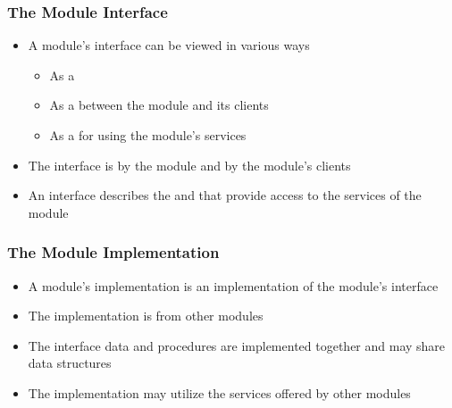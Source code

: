 \documentclass[t,12pt,numbers,fleqn]{beamer}
\begin{document}
\begin{frame}
\frametitle{The Module Interface}

\begin{itemize}

\item A module's interface can be viewed in various ways
\begin{itemize}
\item As a 
\item As a  between the module and its clients
\item As a  for using the module's services
\end{itemize}
\item The interface is  by the module and
   by the module's clients
\item An interface describes the  and 
  that provide access to the services of the module

\end{itemize}

\end{frame}


\begin{frame}
\frametitle{The Module Implementation}

\begin{itemize}

\item A module's implementation is an implementation of the module's interface
\item The implementation is  from other modules
\item The interface data and procedures are implemented together and may share
  data structures
\item The implementation may utilize the services offered by other modules

\end{itemize}

\end{frame}

\end{document}
